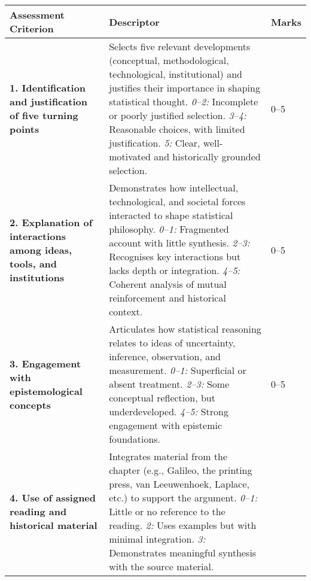 \documentclass[
  10t,
]{article}
\begin{document}
\begin{small}
\begin{raggedright}
\begin{longtable*}{|p{4.2cm}|p{9cm}|p{1.8cm}|}
\hline
\textbf{Assessment Criterion} & \textbf{Descriptor} & \textbf{Marks} \\
\hline
\textbf{1. Identification and justification of five turning points} & 
Selects five relevant developments (conceptual, methodological, technological, institutional) and justifies their importance in shaping statistical thought. \newline
\textit{0–2:} Incomplete or poorly justified selection. \newline
\textit{3–4:} Reasonable choices, with limited justification. \newline
\textit{5:} Clear, well-motivated and historically grounded selection. & 
0–5 \\
\hline
\textbf{2. Explanation of interactions among ideas, tools, and institutions} & 
Demonstrates how intellectual, technological, and societal forces interacted to shape statistical philosophy. \newline
\textit{0–1:} Fragmented account with little synthesis. \newline
\textit{2–3:} Recognises key interactions but lacks depth or integration. \newline
\textit{4–5:} Coherent analysis of mutual reinforcement and historical context. & 
0–5 \\
\hline
\textbf{3. Engagement with epistemological concepts} & 
Articulates how statistical reasoning relates to ideas of uncertainty, inference, observation, and measurement. \newline
\textit{0–1:} Superficial or absent treatment. \newline
\textit{2–3:} Some conceptual reflection, but underdeveloped. \newline
\textit{4–5:} Strong engagement with epistemic foundations. & 
0–5 \\
\hline
\textbf{4. Use of assigned reading and historical material} & 
Integrates material from the chapter (e.g., Galileo, the printing press, van Leeuwenhoek, Laplace, etc.) to support the argument. \newline
\textit{0–1:} Little or no reference to the reading. \newline
\textit{2:} Uses examples but with minimal integration. \newline
\textit{3:} Demonstrates meaningful synthesis with the source material. & 

\end{longtable*}
\end{raggedright}
\end{small}
\end{document}
